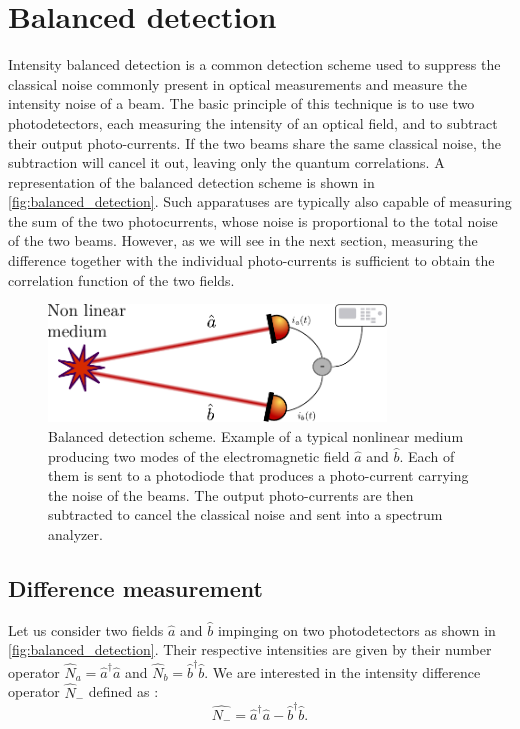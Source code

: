\section{Balanced detection}
Intensity balanced detection is a common detection scheme used to suppress the classical noise commonly present in optical measurements and measure the intensity noise of a beam.
The basic principle of this technique is to use two photodetectors, each measuring the intensity of an optical field, and to subtract their output photo-currents. If the two 
beams share the same classical noise, the subtraction will cancel it out, leaving only the quantum correlations. A representation of the balanced detection scheme is shown in \autoref{fig:balanced_detection}.
Such apparatuses are typically also capable of measuring the sum of the two photocurrents, whose noise is proportional to the total noise of the two beams.
 However,
as we will see in the next section, measuring the difference together with the individual photo-currents is sufficient to obtain the correlation function of the two fields.
\begin{figure}
    \centering
    \includegraphics[width=0.8\textwidth]{chap_correlation/fig/balanced_detection.pdf}
    \caption{Balanced detection scheme. Example of a typical nonlinear medium producing two modes of the electromagnetic field $\hat{a}$ and $\hat{b}$. Each of them is sent to a photodiode that produces a photo-current carrying the noise
    of the beams. The output photo-currents are then subtracted to cancel the classical noise and sent into a spectrum analyzer.}
    \label{fig:balanced_detection}
\end{figure} 

\subsection{Difference measurement}
Let us consider two fields $\hat{a}$ and $\hat{b}$ impinging on two photodetectors as shown in \autoref{fig:balanced_detection}. Their respective intensities 
are given by their number operator $\hat{N}_a=\hat{a}^\dagger\hat{a}$ and $\hat{N}_b=\hat{b}^\dagger\hat{b}$.
We are interested in the intensity difference operator $\hat{N}_-$ defined as :
\begin{equation}
    \label{eq:diff_op}
    \hat{N_-} = \hat{a}^\dagger\hat{a} - \hat{b}^\dagger\hat{b}.
\end{equation}

